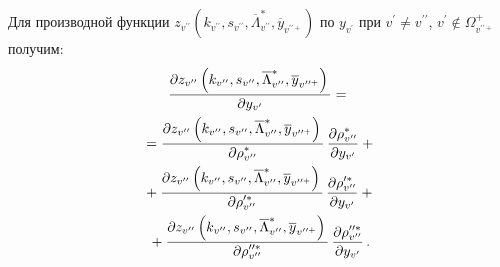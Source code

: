 \begin{multicols}{2}
\noindent
Для производной функции $z_{ v^{\prime\prime}} \left(k_{ v^{\prime\prime}}, 
s_{ v^{\prime\prime}}, \overline{\Lambda}^*_{ v^{\prime\prime}}, 
\overline{y}_{ v^{\prime\prime +}}\right)$ по $y_{v^\prime}$ при $v^\prime\not= 
v^{\prime\prime}$, $v^\prime\not\in \Omega^+_{v^{\prime\prime +}}$ получим:
   \begin{multline}
      \displaystyle\frac{\displaystyle \partial z_{ v^{\prime\prime}}\left(k_{ v^{\prime\prime}}, s_{ 
v^{\prime\prime}}, \overline{\Lambda}^*_{ v^{\prime\prime}}, \overline{y}_{ 
v^{\prime\prime +}}\right)\mathstrut}{\displaystyle \partial y_{v^\prime}\mathstrut}={}\\
{}=
   \displaystyle\frac{\displaystyle \partial z_{ v^{\prime\prime}}\left(k_{ v^{\prime\prime}}, s_{ 
v^{\prime\prime}}, \overline{\Lambda}^*_{ v^{\prime\prime}}, \overline{y}_{ 
v^{\prime\prime +}}\right)\mathstrut}{\displaystyle \partial \rho^*_{ v^{\prime\prime}}\mathstrut}\,\displaystyle\frac{\displaystyle \partial \rho^*_{ 
v^{\prime\prime}}\mathstrut}{\displaystyle \partial y_{v^\prime}\mathstrut}+{}\\
{}+
   \displaystyle\frac{\displaystyle \partial z_{ v^{\prime\prime}}\left(k_{ v^{\prime\prime}},s_{ 
v^{\prime\prime}}, \overline{\Lambda}^*_{ v^{\prime\prime}},
\overline{y}_{v^{\prime\prime +}}\right)\mathstrut}{\displaystyle \partial \rho^{\prime *}_{ v^{\prime\prime}}\mathstrut}\,
   \displaystyle\frac{\displaystyle \partial \rho_{ v^{\prime\prime}}^{\prime *}\mathstrut}{\displaystyle \partial 
y_{v^\prime}\mathstrut}+{}\\
   {}+ \displaystyle\frac{\displaystyle \partial z_{ v^{\prime\prime}}\left(k_{ v^{\prime\prime}}, s_{ 
v^{\prime\prime}}, \overline{\Lambda}^*_{ v^{\prime\prime}}, 
\overline{y}_{v^{\prime\prime +}}\right)\mathstrut}{\displaystyle \partial \rho_{ v^{\prime\prime}}^{\prime\prime *}\mathstrut}\,
\displaystyle\frac{\displaystyle \partial \rho_{v^{\prime\prime}}^{\prime\prime *}\mathstrut}{\displaystyle \partial y_{v^\prime}\mathstrut}\,.
   \label{e11aga}
   \end{multline}
     

\end{multicols}
